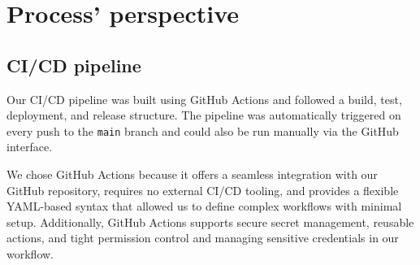 \section{Process' perspective}
\begin{comment}
{

## 2. Process' perspective
This perspective should clarify how code or other artifacts come from idea into the running system and everything that happens on the way.

In particular, the following descriptions should be included:



## 2.1 A complete description of stages and tools included in the CI/CD chains, including deployment and release of your systems.

## 2.2 How do you monitor your systems and what precisely do you monitor?(alexandra :/)

## 2.3 What do you log in your systems and how do you aggregate logs? (oscar is such a stud)

## 2.4 Brief results of the security assessment and brief description of how did you harden the security of your system based on the analysis.

## 2.5 Applied strategy for scaling and upgrades.

In case you have used AI-assistants during your project briefly explain which system(s) you used during the project and reflect how it supported or hindered your process.
}
\end{comment}

\subsection{CI/CD pipeline}
Our CI/CD pipeline was built using GitHub Actions and followed a build, test, deployment, and release structure. The pipeline was automatically triggered on every push to the \texttt{main} branch and could also be run manually via the GitHub interface.

We chose GitHub Actions because it offers a seamless integration with our GitHub repository, requires no external CI/CD tooling, and provides a flexible YAML-based syntax that allowed us to define complex workflows with minimal setup. Additionally, GitHub Actions supports secure secret management, reusable actions, and tight permission control and managing sensitive credentials in our workflow.

